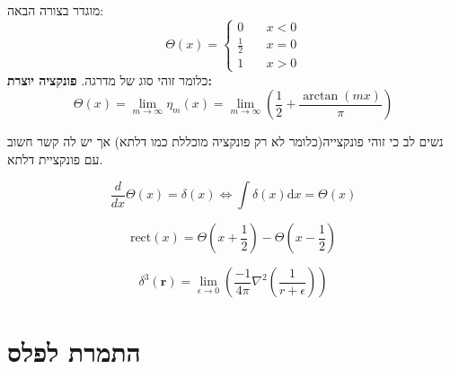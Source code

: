 \documentclass{tstextbook}
\begin{document}
\begin{definition}
מוגדר בצורה הבאה:
$$ \Theta\left(x\right)=\begin{cases}0&\quad x<0\\\frac{1}{2}&\quad x=0\\1&\quad x>0\end{cases}$$
כלומר זוהי סוג של מדרגה. 
\textbf{פונקציה יוצרת:}$$ \Theta(x)=\lim\limits_{m\to\infty}\eta_m(x)=\lim\limits_{m\to\infty}\left(\frac{1}{2}+\frac{\arctan(mx)}{\pi}\right)$$

\end{definition}
נשים לב כי זוהי פונקצייה(כלומר לא רק פונקציה מוכללת כמו דלתא) אך יש לה קשר חשוב עם פונקציית דלתא.

\begin{proposition}
$$\frac{d}{dx}\Theta(x)=\delta(x) \iff \int\delta(x)\mathrm{d}x=\Theta(x)$$

\end{proposition}
\begin{proposition}
$$\mathrm{rect}\left( x \right)=\Theta\left( x+\frac{1}{2} \right)-\Theta\left( x-\frac{1}{2} \right)$$

\end{proposition}
\begin{definition}
$$\delta^{3}(\mathbf{r})=\operatorname*{lim}_{\epsilon\to0}\left({\frac{-1}{4\pi}}\nabla^{2}\left({\frac{1}{r+\epsilon}}\right)\right)$$

\end{definition}
\section{התמרת לפלס}
\end{document}

